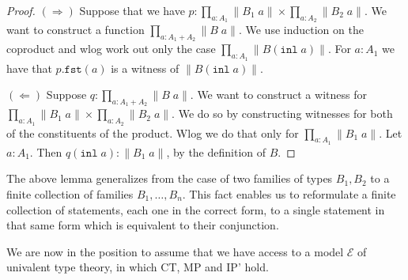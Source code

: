 \documentclass[12pt]{report}
\begin{document}
\begin{proof}
$(\Rightarrow )$ Suppose that we have $p : \prod_{a : A_1}\lVert B_1\; a\rVert \times \prod_{a : A_2}\lVert B_2\;a \rVert$. 
We want to construct a function $\prod_{a : A_1 + A_2} \lVert B\; a \rVert$. 
We use induction on the coproduct and wlog work out only the case $\prod_{a : A_1} \lVert B(\mathtt{inl}\; a)\rVert$. 
For $a : A_1$ we have that $p.\mathtt{fst}(a)$ is a witness of $\lVert B(\mathtt{inl}\; a) \rVert$.

$(\Leftarrow) $ Suppose $q : \prod_{a : A_1 + A_2} \lVert B\; a \rVert$. 
We want to construct a witness for $\prod_{a : A_1}\lVert B_1\; a\rVert \times \prod_{a : A_2}\lVert B_2\;a \rVert$. 
We do so by constructing witnesses for both of the constituents of the product. 
Wlog we do that only for $\prod_{a : A_1}\lVert B_1\; a\rVert$. 
Let $a : A_1$. Then $q(\mathtt{inl}\; a) : \lVert B_1\; a \rVert$, by the definition of $B$.
\end{proof}
The above lemma generalizes from the case of two families of types $B_1, B_2$ to a finite collection of families $B_1,\ldots,B_n$. 
This fact enables us to reformulate a finite collection of statements, each one in the correct form, to a single statement in that same form which is equivalent to their conjunction. 

We are now in the position to assume that we have access to a model $\mathcal{E}$ of univalent type theory, in which CT, MP and IP' hold. 
\end{document}
